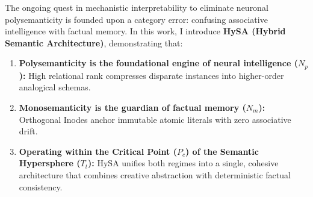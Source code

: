 \documentclass[10pt,twocolumn]{article}
\theoremstyle{definition}
\begin{document}
The ongoing quest in mechanistic interpretability to eliminate neuronal polysemanticity is founded upon a category error: confusing associative intelligence with factual memory. In this work, I introduce \textbf{HySA (Hybrid Semantic Architecture)}, demonstrating that:
\begin{enumerate}[leftmargin=*, itemsep=1.5pt]
    \item \textbf{Polysemanticity is the foundational engine of neural intelligence ($N_p$):} High relational rank compresses disparate instances into higher-order analogical schemas.
    \item \textbf{Monosemanticity is the guardian of factual memory ($N_m$):} Orthogonal Inodes anchor immutable atomic literals with zero associative drift.
    \item \textbf{Operating within the Critical Point ($P_c$) of the Semantic Hypersphere ($T_t$):} HySA unifies both regimes into a single, cohesive architecture that combines creative abstraction with deterministic factual consistency.
\end{enumerate}
\end{document}
